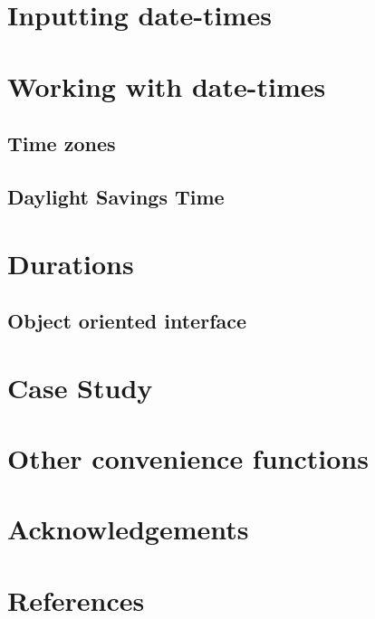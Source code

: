 \documentclass[article]{jss}
\begin{document}
\section{Inputting date-times}
\section{Working with date-times}
\label{sec:accessors}

\subsection{Time zones}
\subsection{Daylight Savings Time}
\section{Durations}
\subsection{Object oriented interface}
\section{Case Study}
\section{Other convenience functions}
\section*{Acknowledgements}
\section*{References}
\end{document}
